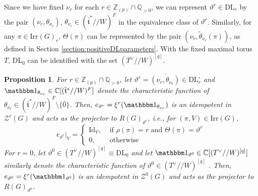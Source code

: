 \documentclass[11 pt]{article}
\numberwithin{equation}{subsection}
\newtheorem{proposition}[theorem]{Proposition}
\theoremstyle{definition}
\theoremstyle{remark}
\theoremstyle{conjecture}
\newcommand{\bt}{\bar{\mathfrak t}}
\newcommand{\Irr}{\mathrm{Irr}}
\newcommand{\DL}{\mathrm{DL}}
\newcommand{\mbm}{\mathbbm}
\newcommand{\Z}{\mathbb Z}
\newcommand{\Q}{\mathbb Q}
\newcommand{\C}{\mathbb C}
\newcommand{\ZZ}{\mathcal{Z}}
\begin{document}
Since we have fixed $\nu_r$ for each $r \in \Z_{(p)}\cap \Q_{>0}$, we can represent $\vartheta^r \in \DL_r$ by the pair $(\nu_r, \theta_{\nu_r})$, $\theta_{\nu_r}\in (\bt^*//W)^F$ in the equivalence class of $\vartheta^r$. Similarly, for any $\pi \in \Irr(G)_r$, $\Theta(\pi)$ can be represented by the pair $(\nu_r, \tilde\theta_{\nu_r}(\pi))$, as defined in Section \ref{section:positiveDLparameters}. With the fixed maximal torus $T$, $\DL_0$ can be identified with the set $(T^\vee//W)^{[q]}$. 

\begin{proposition}\label{prop:projectorpackets}
    For $r \in \Z_{(p)}\cap \Q_{>0}$, let $\vartheta^r=\overline{(\nu_r, \theta_{\nu_r})} \in \DL_r^\circ$ and $\mbm 1_{\theta_{\nu_r}} \in \C[(\bt^*//W)^F]$ denote the characteristic function of $\theta_{\nu_r} \in (\bt^*//W)^F\setminus\{\bar 0\}$. Then, $e_{\vartheta^r}= \xi^r( \mbm 1_{\theta_{\nu_r}})$  is an idempotent in $\ZZ^r(G)$ and acts as the projector to $R(G)_{\vartheta^r}$, i.e., for $(\pi,V)\in \Irr(G)$, 
    \begin{equation*}
        e_{\vartheta^r}|_V=\begin{cases}
        \mathrm{Id}_V, & \text{ if } \rho(\pi)= r \text{ and } \Theta(\pi)=\vartheta^r\\
        0, & \text{ otherwise}
    \end{cases}
    \end{equation*}
    For $r=0$,  let $\vartheta^0 \in  (T^\vee//W)^{[q]}\equiv \DL_0 $ and let $\mbm 1_{\vartheta^0} \in \C[(T^\vee//W)^{[q]}]$ similarly denote the characteristic function of $\vartheta^0 \in (T^\vee//W)^{[q]}$ . Then, $e_{\vartheta^0}=\xi^r(\mbm 1_{\vartheta^0}) $ is an idempotent in $\ZZ^0(G)$ and acts as the projector to $R(G)_{\vartheta^0}$. 
\end{proposition}
\end{document}
